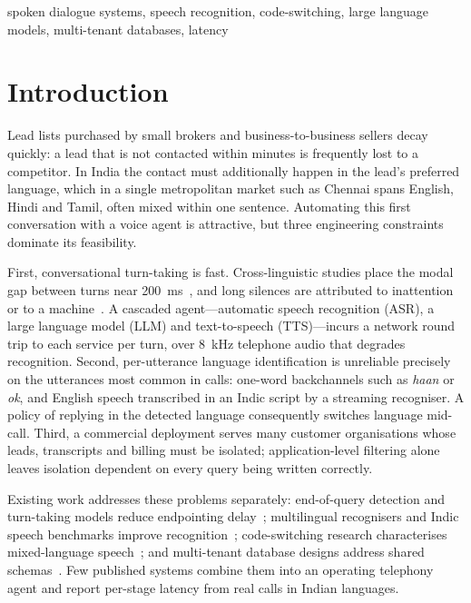 \documentclass[conference]{IEEEtran}
\begin{document}
\begin{IEEEkeywords}
spoken dialogue systems, speech recognition, code-switching, large language models, multi-tenant databases, latency
\end{IEEEkeywords}

\section{Introduction}
Lead lists purchased by small brokers and business-to-business sellers decay quickly: a lead that is not contacted within minutes is frequently lost to a competitor. In India the contact must additionally happen in the lead's preferred language, which in a single metropolitan market such as Chennai spans English, Hindi and Tamil, often mixed within one sentence. Automating this first conversation with a voice agent is attractive, but three engineering constraints dominate its feasibility.

First, conversational turn-taking is fast. Cross-linguistic studies place the modal gap between turns near 200~ms~\cite{stivers2009}, and long silences are attributed to inattention or to a machine~\cite{skantze2021}. A cascaded agent---automatic speech recognition (ASR), a large language model (LLM) and text-to-speech (TTS)---incurs a network round trip to each service per turn, over 8~kHz telephone audio that degrades recognition. Second, per-utterance language identification is unreliable precisely on the utterances most common in calls: one-word backchannels such as \emph{haan} or \emph{ok}, and English speech transcribed in an Indic script by a streaming recogniser. A policy of replying in the detected language consequently switches language mid-call. Third, a commercial deployment serves many customer organisations whose leads, transcripts and billing must be isolated; application-level filtering alone leaves isolation dependent on every query being written correctly.

Existing work addresses these problems separately: end-of-query detection and turn-taking models reduce endpointing delay~\cite{skantze2021,shannon2017}; multilingual recognisers and Indic speech benchmarks improve recognition~\cite{radford2023,pratap2024,javed2023}; code-switching research characterises mixed-language speech~\cite{sitaram2019}; and multi-tenant database designs address shared schemas~\cite{aulbach2008}. Few published systems combine them into an operating telephony agent and report per-stage latency from real calls in Indian languages.
\end{document}
